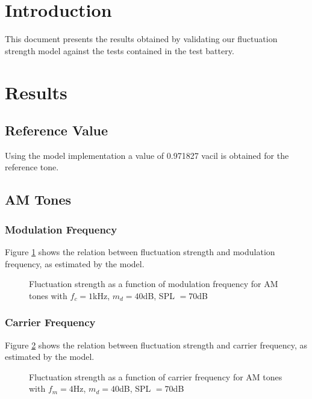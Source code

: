 \documentclass[a4paper]{article}
\begin{document}

\section{Introduction}

This document presents the results obtained by validating our fluctuation
strength model against the tests contained in the test battery.

\section{Results}

\subsection{Reference Value}

Using the model implementation a value of 0.971827 vacil is obtained for the
reference tone.

\subsection{AM Tones}

\subsubsection{Modulation Frequency}

Figure \ref{fig:AMtonesfmplot} shows the relation between fluctuation strength
and modulation frequency, as estimated by the model.

\begin{figure}[ht]
    \centering
    \resizebox{!}{8cm}{
        
    }
    \caption{Fluctuation strength as a function of modulation frequency for AM
        tones with $f_c = 1 $kHz, $m_d = 40 $dB, SPL $= 70 $dB}
    \label{fig:AMtonesfmplot}
\end{figure}

\subsubsection{Carrier Frequency}

Figure \ref{fig:AMtonesfcplot} shows the relation between fluctuation strength
and carrier frequency, as estimated by the model.

\begin{figure}[ht]
    \centering
    \resizebox{!}{8cm}{
        
    }
    \caption{Fluctuation strength as a function of carrier frequency for AM
        tones with $f_m = 4 $Hz, $m_d = 40 $dB, SPL $= 70 $dB}
    \label{fig:AMtonesfcplot}
\end{figure}
\end{document}
